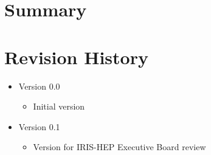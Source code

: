 \documentclass[11pt,letterpaper,fleqn]{article}
\begin{document}
\section{Summary}
\blindtext[2]

\appendix
\newpage
\section{Revision History}

\vspace{8pt}
\begin{itemize}
  \item Version 0.0
  \vspace{-5pt}
  \begin{itemize}
    \item Initial version
  \end{itemize}
  \item Version 0.1
  \vspace{-5pt}
  \begin{itemize}
    \item Version for IRIS-HEP Executive Board review
  \end{itemize}
\end{itemize}
\end{document}
